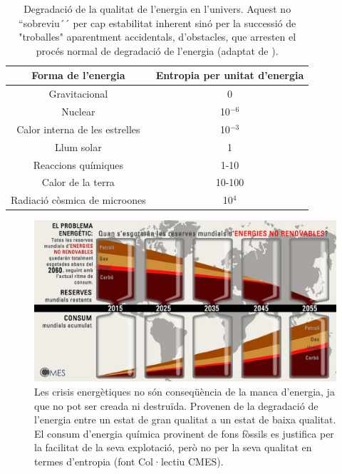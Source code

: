 \begin{table}[h!]
  \begin{center}
    \caption{Degradació de la qualitat de l'energia en l'univers. Aquest no ``sobreviu´´ per cap estabilitat inherent sinó per la successió de "troballes" aparentment accidentals, d'obstacles, que arresten el procés normal de degradació de l'energia (adaptat de \cite{Dyson1971}).}
    \label{tab:DegradacioEnergia}
       \begin{tabular}{cc}
Forma de l'energia & Entropia per unitat d'energia\\
\hline
Gravitacional & 0 \\
Nuclear & 10$^{-6}$ \\
Calor interna de les estrelles & 10$^{-3}$ \\
Llum solar & 1 \\
Reaccions químiques & 1-10 \\
Calor de la terra & 10-100 \\
Radiació còsmica de microones & 10$^4$ \\
\hline
       \end{tabular}
   \end{center}
\end{table}

\begin{figure}[h]
\centering
\includegraphics[scale=0.8]{figures/EsgotamentEnergia.png}
\caption{Les crisis energètiques no són conseqüència de la manca d'energia, ja que no pot ser creada ni destruïda. Provenen de la degradació de l'energia entre un estat de gran qualitat a un estat de baixa qualitat. El consum d'energia química provinent de fons fòssils es justifica per la facilitat de la seva explotació, però no per la seva qualitat en termes d'entropia (font Col·lectiu CMES).}
\label{fig:EsgotamentEnergia}
\end{figure}


